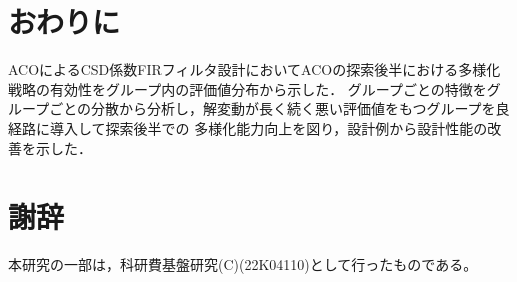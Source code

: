 \documentclass[dvipdfmx,9pt]{ieej}
\begin{document}
\section{おわりに}
ACOによるCSD係数FIRフィルタ設計においてACOの探索後半における多様化戦略の有効性をグループ内の評価値分布から示した．
グループごとの特徴をグループごとの分散から分析し，解変動が長く続く悪い評価値をもつグループを良経路に導入して探索後半での
多様化能力向上を図り，設計例から設計性能の改善を示した．

\section{謝辞}
本研究の一部は，科研費基盤研究(C)(22K04110)として行ったものである。


\begin{thebibliography}{99}

\end{thebibliography}
\end{document}
